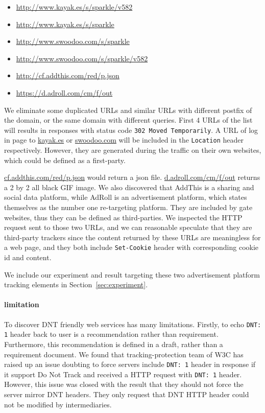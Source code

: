 \documentclass{sig-alternate}
\begin{document}
\begin{itemize}
\item \url{http://www.kayak.es/s/sparkle/v582}
\item \url{http://www.kayak.es/s/sparkle}
\item \url{http://www.swoodoo.com/s/sparkle}
\item \url{http://www.swoodoo.com/s/sparkle/v582}
\item \url{http://cf.addthis.com/red/p.json}
\item \url{https://d.adroll.com/cm/f/out}
\end{itemize}

We eliminate some duplicated URLs and similar URLs with different postfix of the domain, or the same domain with different queries. First 4 URLs of the list will results in responses with status code \verb|302 Moved Temporarily|. A URL of log in page to \url{kayak.es} or \url{swoodoo.com} will be included in the \texttt{Location} header respectively. However, they are generated during the traffic on their own websites, which could be defined as a first-party.

\url{cf.addthis.com/red/p.json} would return a json file. \url{d.adroll.com/cm/f/out} returns a 2 by 2 all black GIF image. We also discovered that AddThis is a sharing and social data platform, while AdRoll is an advertisement platform, which states themselves as the number one re-targeting platform. They are included by gate websites, thus they can be defined as third-parties. We inspected the HTTP request sent to those two URLs, and we can reasonable speculate that they are third-party trackers since the content returned by these URLs are meaningless for a web page, and they both include \texttt{Set-Cookie} header with corresponding cookie id and content.

We include our experiment and result targeting these two advertisement platform tracking elements in Section~\ref{sec:experiment}. 

\paragraph{limitation}
To discover DNT friendly web services has many limitations. Firstly, to echo \verb|DNT: 1| header back to user is a recommendation rather than requirement. Furthermore, this recommendation is defined in a draft\cite{dntdraft}, rather than a requirement document. We found that tracking-protection team of W3C has raised up an issue doubting to force servers include \verb|DNT: 1| header in response if it support Do Not Track and received a HTTP request with \verb|DNT: 1| header. However, this issue was closed with the result that they should not force the server mirror DNT headers. They only request that DNT HTTP header could not be modified by intermediaries.
\end{document}
